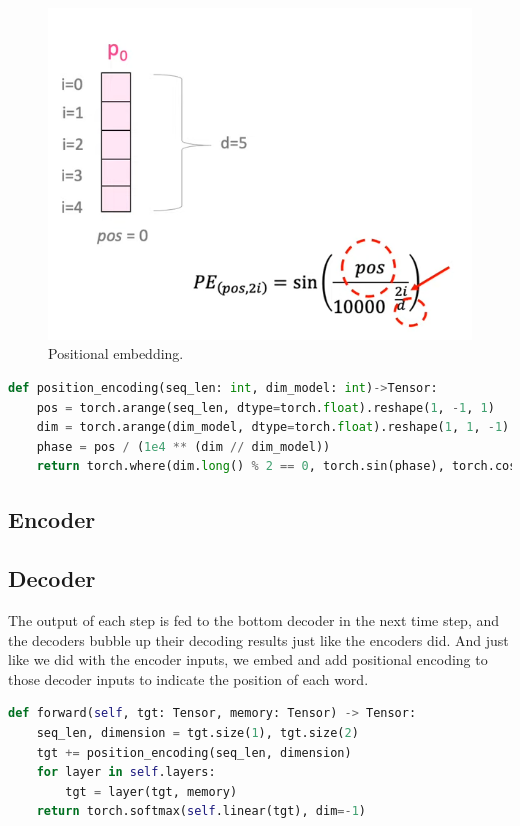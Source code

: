 \begin{figure}[t]
	\centering
	\includegraphics[scale=0.6]{./images/transformer/positional_1.png}
	\caption{Positional embedding.}
\end{figure}


\begin{lstlisting}[language=Python]
def position_encoding(seq_len: int, dim_model: int)->Tensor:
    pos = torch.arange(seq_len, dtype=torch.float).reshape(1, -1, 1)
    dim = torch.arange(dim_model, dtype=torch.float).reshape(1, 1, -1)
    phase = pos / (1e4 ** (dim // dim_model))
    return torch.where(dim.long() % 2 == 0, torch.sin(phase), torch.cos(phase))
\end{lstlisting}

\subsection{Encoder}

\subsection{Decoder}
The output of each step is fed to the bottom decoder in the next time step, and the decoders bubble up their decoding results just like the encoders did. And just like we did with the encoder inputs, we embed and add positional encoding to those decoder inputs to indicate the position of each word.

\begin{lstlisting}[language=Python]
def forward(self, tgt: Tensor, memory: Tensor) -> Tensor:
	seq_len, dimension = tgt.size(1), tgt.size(2)
	tgt += position_encoding(seq_len, dimension)
	for layer in self.layers:
		tgt = layer(tgt, memory)
	return torch.softmax(self.linear(tgt), dim=-1)
\end{lstlisting}


